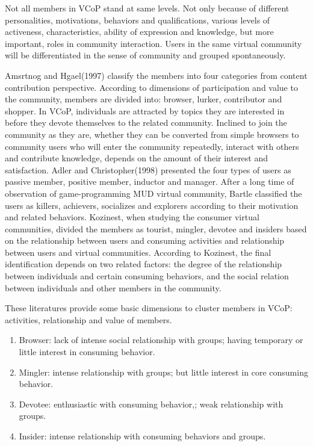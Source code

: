 \documentclass{elsarticle}
\begin{document}
Not all members in VCoP stand at same levels. Not only because of  different personalities, motivations,
behaviors and qualifications, various levels of activeness,
characteristics, ability of expression and knowledge, but more important, roles in
community interaction. Users in the same virtual community will be
differentiated in the sense of community and grouped spontaneously. 

Amsrtnog and Hgael(1997) classify the members into four categories from
content contribution perspective.  According to dimensions of participation and value to
the community, members are divided  into:  browser, lurker, contributor and shopper\cite{hagel1997net}. In VCoP, individuals are attracted
by topics they are interested in before they devote themselves to the
related community. Inclined to join the community as they are, whether
they can be converted from simple browsers to community users who will
enter the community repeatedly, interact with others and contribute
knowledge, depends on the amount of their interest and
satisfaction. Adler and Christopher(1998) presented the four types of
users as passive member, positive member, inductor and
manager\cite{Christopher1998}. After a long time of observation of
game-programming MUD virtual community, Bartle classified the users as killers, achievers, socializes and explorers according to their motivation and related behaviors\cite{mud}. Kozinest, when studying the consumer virtual communities, divided the members as tourist, mingler, devotee and insiders based on the relationship between users and consuming activities and relationship between users and virtual communities\cite{Kozinets1999252}. According to Kozinest, the final identification depends on two related factors: the degree of the relationship between individuals and certain consuming behaviors, and the social relation between individuals and other members in the community. 

These  literatures  provide some basic dimensions to cluster members
in VCoP: activities, relationship and value of members. 
\begin{enumerate}
\item Browser: lack of intense social relationship with groups; having
  temporary or little interest in consuming behavior. 
\item Mingler: intense relationship with groups; but little interest in core consuming behavior.
\item Devotee: enthusiastic with consuming behavior,; weak
  relationship with groups. 
\item  Insider: intense relationship with consuming behaviors and groups. 
\end{enumerate}
\end{document}
